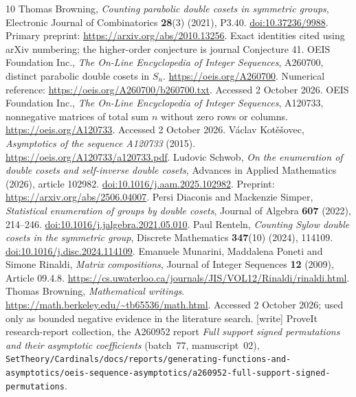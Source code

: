 \documentclass[11pt,letterpaper]{article}
\theoremstyle{remark}\newtheorem{remark}[theorem]{Remark}
\begin{document}
\begingroup\raggedright
\begin{thebibliography}{10}
 Thomas Browning, \emph{Counting parabolic double cosets in symmetric groups}, Electronic Journal of Combinatorics \textbf{28}(3) (2021), P3.40. \href{https://doi.org/10.37236/9988}{doi:10.37236/9988}. Primary preprint: \url{https://arxiv.org/abs/2010.13256}. Exact identities cited using arXiv numbering; the higher-order conjecture is journal Conjecture 41.
 OEIS Foundation Inc., \emph{The On-Line Encyclopedia of Integer Sequences}, A260700, distinct parabolic double cosets in $S_n$. \url{https://oeis.org/A260700}. Numerical reference: \url{https://oeis.org/A260700/b260700.txt}. Accessed 2 October 2026.
 OEIS Foundation Inc., \emph{The On-Line Encyclopedia of Integer Sequences}, A120733, nonnegative matrices of total sum $n$ without zero rows or columns. \url{https://oeis.org/A120733}. Accessed 2 October 2026.
 V\'aclav Kot\v{e}\v{s}ovec, \emph{Asymptotics of the sequence A120733} (2015). \url{https://oeis.org/A120733/a120733.pdf}.
 Ludovic Schwob, \emph{On the enumeration of double cosets and self-inverse double cosets}, Advances in Applied Mathematics (2026), article 102982. \href{https://doi.org/10.1016/j.aam.2025.102982}{doi:10.1016/j.aam.2025.102982}. Preprint: \url{https://arxiv.org/abs/2506.04007}.
 Persi Diaconis and Mackenzie Simper, \emph{Statistical enumeration of groups by double cosets}, Journal of Algebra \textbf{607} (2022), 214--246. \href{https://doi.org/10.1016/j.jalgebra.2021.05.010}{doi:10.1016/j.jalgebra.2021.05.010}.
 Paul Renteln, \emph{Counting Sylow double cosets in the symmetric group}, Discrete Mathematics \textbf{347}(10) (2024), 114109. \href{https://doi.org/10.1016/j.disc.2024.114109}{doi:10.1016/j.disc.2024.114109}.
 Emanuele Munarini, Maddalena Poneti and Simone Rinaldi, \emph{Matrix compositions}, Journal of Integer Sequences \textbf{12} (2009), Article 09.4.8. \url{https://cs.uwaterloo.ca/journals/JIS/VOL12/Rinaldi/rinaldi.html}.
 Thomas Browning, \emph{Mathematical writings}. \url{https://math.berkeley.edu/~tb65536/math.html}. Accessed 2 October 2026; used only as bounded negative evidence in the literature search.
 [write] ProveIt research-report collection, the A260952
report \emph{Full support signed permutations and their asymptotic
coefficients} (batch~77, manuscript~02),
\nolinkurl{SetTheory/Cardinals/docs/reports/generating-functions-and-asymptotics/oeis-sequence-asymptotics/a260952-full-support-signed-permutations}.

\end{thebibliography}
\end{document}
